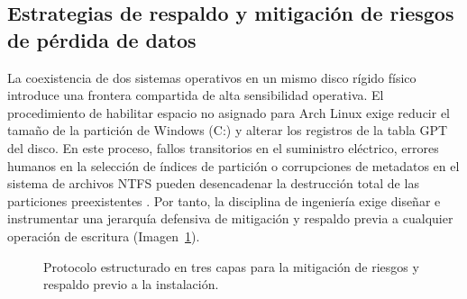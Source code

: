 \documentclass[12pt]{article}
\begin{document}
\subsection{Estrategias de respaldo y mitigación de riesgos de pérdida de datos}
\label{sec:estrategiasRespaldo}

La coexistencia de dos sistemas operativos en un mismo disco rígido físico introduce una frontera compartida de alta sensibilidad operativa. El procedimiento de habilitar espacio no asignado para Arch Linux exige reducir el tamaño de la partición de Windows (C:) y alterar los registros de la tabla GPT del disco. En este proceso, fallos transitorios en el suministro eléctrico, errores humanos en la selección de índices de partición o corrupciones de metadatos en el sistema de archivos NTFS pueden desencadenar la destrucción total de las particiones preexistentes \parencite[\S 12.7, pp.\ 424--426]{silberschatz2006fundamentos}. Por tanto, la disciplina de ingeniería exige diseñar e instrumentar una jerarquía defensiva de mitigación y respaldo previa a cualquier operación de escritura (Imagen~\ref{fig:jerarquiaRespaldo}).

\begin{figure}[H]
\centering
{}
\caption{Protocolo estructurado en tres capas para la mitigación de riesgos y respaldo previo a la instalación.}
\label{fig:jerarquiaRespaldo}
\end{figure}
\end{document}
